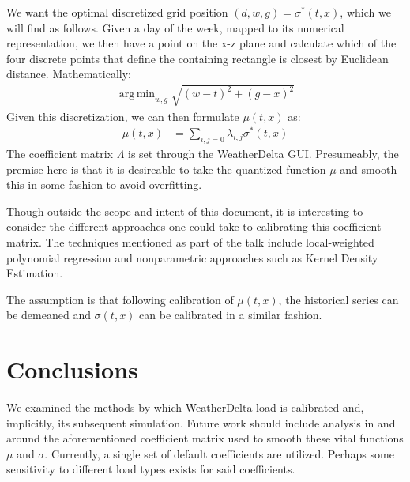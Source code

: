 \documentclass[11pt, a4paper]{article}
\DeclareMathOperator*{\argmin}{arg\,min}
\begin{document}
We want the optimal discretized grid position
$(d,w,g) = \sigma^*(t,x)$, which we will find as follows.  Given a day
of the week, mapped to its numerical representation, we then have a
point on the x-z plane and calculate which of the four discrete points
that define the containing rectangle is closest by Euclidean distance.
Mathematically:
\begin{align*}
  \argmin_{w,g} \sqrt{(w-t)^2 + (g-x)^2}
\end{align*}
Given this discretization, we can then formulate $\mu(t,x)$ as:
\begin{align*}
  \mu(t,x) &= \sum_{i,j=0} \lambda_{i,j} \sigma^*(t,x)
\end{align*}
The coefficient matrix $\Lambda$ is set through the WeatherDelta GUI.
Presumeably, the premise here is that it is desireable to take the
quantized function $\mu$ and smooth this in some fashion to avoid
overfitting.

Though outside the scope and intent of this document, it is
interesting to consider the different approaches one could take to
calibrating this coefficient matrix.  The techniques mentioned as part
of the talk include local-weighted polynomial regression and
nonparametric approaches such as Kernel Density Estimation.

The assumption is that following calibration of $\mu(t,x)$, the
historical series can be demeaned and $\sigma(t,x)$ can be calibrated
in a similar fashion.

\section{Conclusions}

We examined the methods by which WeatherDelta load is calibrated and,
implicitly, its subsequent simulation.  Future work should include
analysis in and around the aforementioned coefficient matrix used to
smooth these vital functions $\mu$ and $\sigma$.  Currently, a single
set of default coefficients are utilized.  Perhaps some sensitivity to
different load types exists for said coefficients.
\end{document}
